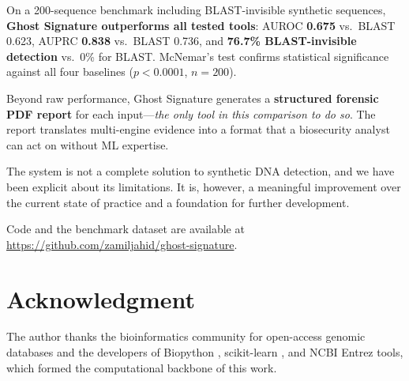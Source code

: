 \documentclass[conference]{IEEEtran}
\begin{document}
On a 200-sequence benchmark including BLAST-invisible synthetic sequences, \textbf{Ghost Signature outperforms all tested tools}: AUROC \textbf{0.675} vs.\ BLAST 0.623, AUPRC \textbf{0.838} vs.\ BLAST 0.736, and \textbf{76.7\% BLAST-invisible detection} vs.\ 0\% for BLAST. McNemar's test confirms statistical significance against all four baselines ($p < 0.0001$, $n = 200$).

Beyond raw performance, Ghost Signature generates a \textbf{structured forensic PDF report} for each input---\textit{the only tool in this comparison to do so}. The report translates multi-engine evidence into a format that a biosecurity analyst can act on without ML expertise.

The system is not a complete solution to synthetic DNA detection, and we have been explicit about its limitations. It is, however, a meaningful improvement over the current state of practice and a foundation for further development.

Code and the benchmark dataset are available at \url{https://github.com/zamiljahid/ghost-signature}.

\section*{Acknowledgment}

The author thanks the bioinformatics community for open-access genomic databases and the developers of Biopython \cite{cock2009}, scikit-learn \cite{sklearn}, and NCBI Entrez tools, which formed the computational backbone of this work.
\end{document}
